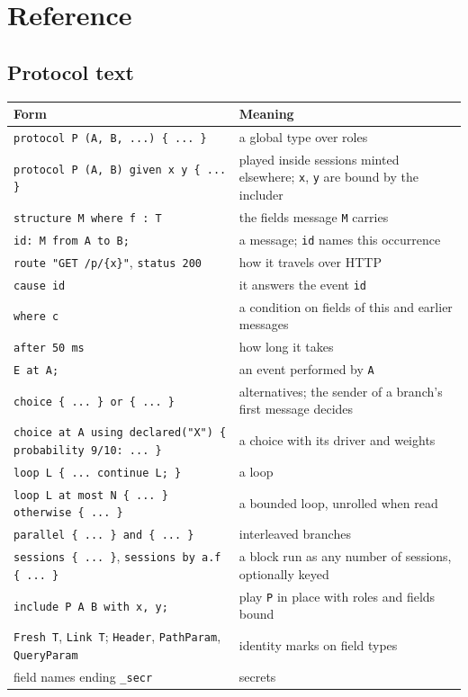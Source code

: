 \chapter{Reference}\label{ch:reference}

\section{Protocol text}

\begin{center}
\begin{tabular}{@{}p{}p{}@{}}
\toprule
Form & Meaning \\
\midrule
\texttt{protocol P (A, B, ...) \{ ... \}} & a global type over roles \\
\texttt{protocol P (A, B) given x y \{ ... \}} & played inside sessions minted elsewhere; \texttt{x}, \texttt{y} are bound by the includer \\
\texttt{structure M where f : T} & the fields message \texttt{M} carries \\
\texttt{id: M from A to B;} & a message; \texttt{id} names this occurrence \\
\quad\texttt{route "GET /p/\{x\}"}, \texttt{status 200} & how it travels over HTTP \\
\quad\texttt{cause id} & it answers the event \texttt{id} \\
\quad\texttt{where c} & a condition on fields of this and earlier messages \\
\quad\texttt{after 50 ms} & how long it takes \\
\texttt{E at A;} & an event performed by \texttt{A} \\
\texttt{choice \{ ... \} or \{ ... \}} & alternatives; the sender of a branch's first message decides \\
\texttt{choice at A using declared("X") \{ probability 9/10: ... \}} & a choice with its driver and weights \\
\texttt{loop L \{ ... continue L; \}} & a loop \\
\texttt{loop L at most N \{ ... \} otherwise \{ ... \}} & a bounded loop, unrolled when read \\
\texttt{parallel \{ ... \} and \{ ... \}} & interleaved branches \\
\texttt{sessions \{ ... \}}, \texttt{sessions by a.f \{ ... \}} & a block run as any number of sessions, optionally keyed \\
\texttt{include P A B with x, y;} & play \texttt{P} in place with roles and fields bound \\
\texttt{Fresh T}, \texttt{Link T}; \texttt{Header}, \texttt{PathParam}, \texttt{QueryParam} & identity marks on field types \\
field names ending \texttt{\_secr} & secrets \\
\bottomrule
\end{tabular}
\end{center}

